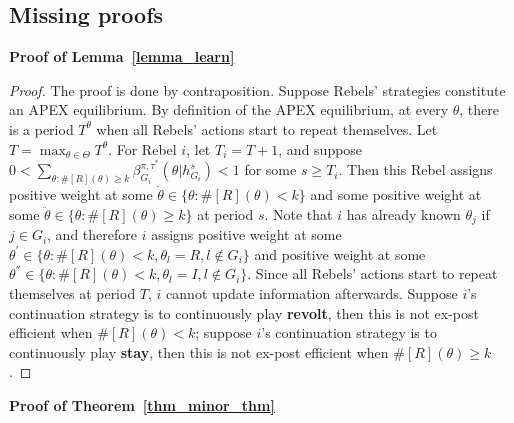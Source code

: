 \documentclass[12pt,letter]{article}
\newtheorem*{theorem*}{Theorem}
\newtheorem*{lemma*}{Lemma}
\theoremstyle{definition}
\theoremstyle{remark}
\theoremstyle{claim}
\begin{document}
\clearpage
\subsection{Missing proofs}
\noindent\textbf{Proof of Lemma~\ref{lemma_learn}}
\begin{proof}
The proof is done by contraposition. Suppose Rebels' strategies constitute an APEX equilibrium. By definition of the APEX equilibrium, at every $\theta$, there is a period $T^{\theta}$ when all Rebels' actions start to repeat themselves. Let $T=\max_{\theta\in \Theta}{T^{\theta}}$. For Rebel $i$, let $T_i=T+1$, and suppose $0<\sum_{\theta:\#[R](\theta)\geq k}\beta^{\pi,\tau^*}_{G_i}(\theta|h^{s}_{G_i})<1$ for some $s\geq T_i$. Then this Rebel assigns positive weight at some $\dot{\theta}\in \{\theta:\#[R](\theta)< k\}$ and some positive weight at some $\ddot{\theta}\in \{\theta:\#[R](\theta)\geq k\}$ at period $s$. Note that $i$ has already known $\theta_j$ if $j\in G_i$, and therefore $i$ assigns positive weight at some $\theta^{'}\in \{\theta:\#[R](\theta)< k, \theta_l=R, l\notin G_i\}$ and positive weight at some $\theta^{''}\in \{\theta:\#[R](\theta)< k, \theta_l=I, l\notin G_i\}$. Since all Rebels' actions start to repeat themselves at period $T$, $i$ cannot update information afterwards. Suppose $i$'s continuation strategy is to continuously play \textbf{revolt}, then this is not ex-post efficient when $\#[R](\theta)< k$; suppose $i$'s continuation strategy is to continuously play \textbf{stay}, then this is not ex-post efficient when $\#[R](\theta)\geq k$.
\end{proof}
%
%
\bigskip
\noindent\textbf{Proof of Theorem~\ref{thm_minor_thm}}
\end{document}
